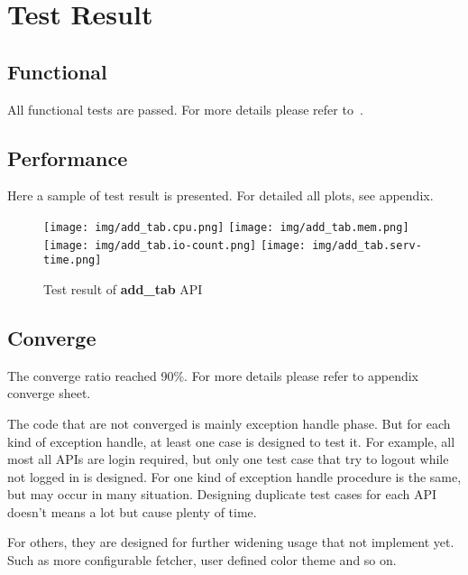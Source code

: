 \section{Test Result}
\label{sec:test_result}
  \subsection{Functional}
    All functional tests are passed. For more details please refer to~.
  \subsection{Performance}
	Here a sample of test result is presented. For detailed all plots, see appendix.
	\begin{figure}[!ht]
		\centering
		\texttt{[image: img/add\_tab.cpu.png]}
		\texttt{[image: img/add\_tab.mem.png]}
		\texttt{[image: img/add\_tab.io-count.png]}
		\texttt{[image: img/add\_tab.serv-time.png]}
		\caption{Test result of \textbf{add\_tab} API}
	\end{figure}
  \subsection{Converge}
    The converge ratio reached 90\%.
    For more details please refer to appendix converge sheet.

    The code that are not converged is mainly exception handle phase.
    But for each kind of exception handle, at least one case is designed to test it.
    For example, all most all APIs are login required,
    but only one test case that try to logout while not logged in is designed.
    For one kind of exception handle procedure is the same, but may occur in many situation.
    Designing duplicate test cases for each API doesn't means a lot but cause plenty of time.

    For others, they are designed for further widening usage that not implement yet.
    Such as more configurable fetcher, user defined color theme and so on.
